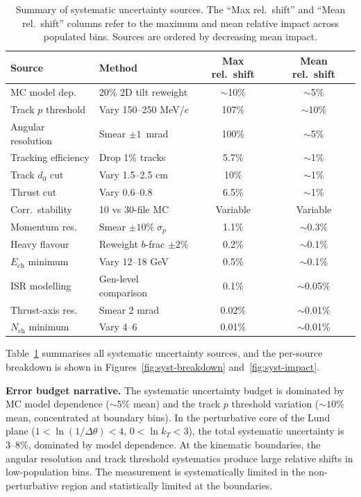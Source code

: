 \documentclass[11pt,a4paper]{article}
\begin{document}
\begin{table}[htbp]
\centering
\caption{Summary of systematic uncertainty sources.  The ``Max rel.\
  shift'' and ``Mean rel.\ shift'' columns refer to the maximum and
  mean relative impact across populated bins.  Sources are ordered
  by decreasing mean impact.}
\label{tbl:syst-summary}
\begin{tabular}{llcc}
\toprule
Source & Method & Max rel.\ shift & Mean rel.\ shift \\
\midrule
MC model dep. & 20\% 2D tilt reweight & $\sim$10\% & $\sim$5\% \\
Track $p$ threshold & Vary 150--250 MeV/$c$ & 107\% & $\sim$10\% \\
Angular resolution & Smear $\pm 1$~mrad & 100\% & $\sim$5\% \\
Tracking efficiency & Drop 1\% tracks & 5.7\% & $\sim$1\% \\
Track $d_0$ cut & Vary 1.5--2.5 cm & 10\% & $\sim$1\% \\
Thrust cut & Vary 0.6--0.8 & 6.5\% & $\sim$1\% \\
Corr.\ stability & 10 vs 30-file MC & Variable & Variable \\
Momentum res. & Smear $\pm 10\%\;\sigma_p$ & 1.1\% & $\sim$0.3\% \\
Heavy flavour & Reweight $b$-frac $\pm 2\%$ & 0.2\% & $\sim$0.1\% \\
$E_\text{ch}$ minimum & Vary 12--18 GeV & 0.5\% & $\sim$0.1\% \\
ISR modelling & Gen-level comparison & 0.1\% & $\sim$0.05\% \\
Thrust-axis res. & Smear 2 mrad & 0.02\% & $\sim$0.01\% \\
$N_\text{ch}$ minimum & Vary 4--6 & 0.01\% & $\sim$0.01\% \\
\bottomrule
\end{tabular}
\end{table}

Table~\ref{tbl:syst-summary} summarises all systematic uncertainty
sources, and the per-source breakdown is shown in
Figures~\ref{fig:syst-breakdown} and~\ref{fig:syst-impact}.

\textbf{Error budget narrative.}  The systematic uncertainty budget
is dominated by MC model dependence ($\sim\!5\%$ mean) and the track
$p$ threshold variation ($\sim\!10\%$ mean, concentrated at boundary
bins).  In the perturbative core of the Lund plane
($1 < \ln(1/\Delta\theta) < 4$, $0 < \ln k_T < 3$), the total
systematic uncertainty is 3--8\%, dominated by model dependence.
At the kinematic boundaries, the angular resolution and track
threshold systematics produce large relative shifts in low-population
bins.  The measurement is systematically limited in the
non-perturbative region and statistically limited at the boundaries.
\end{document}
